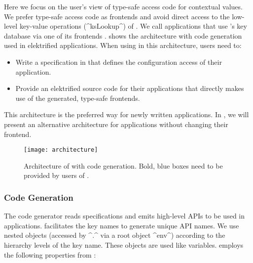 Here we focus on the user's view of type-safe access code for contextual values.
We prefer type-safe access code as frontends and avoid direct access to the low-level key-value operations (^ksLookup^) of .
We call applications that use \elektra{}'s key database via one of its frontends .
 shows the architecture with code generation used in elektrified applications.
When using  in this architecture, users need to:
\begin{itemize}
\item Write a specification in  that defines the configuration access of their application.
\item Provide an elektrified source code for their applications that directly makes use of the generated, type-safe frontends.
\end{itemize}
This architecture is the preferred way for newly written applications.
In , we will present an alternative architecture for applications without changing their frontend.


\begin{figure}[htp]
\centering
\texttt{[image: architecture]}
\caption[Architecture of \elektra{}.]{Architecture of \elektra{} with code generation.
Bold, blue boxes need to be provided by users of \elektra{}.}
\label{fig:architecture}
\end{figure}

\subsubsection{Code Generation}
\label{sec:approach-code-generation}

The code generator  reads  specifications and emits high-level APIs to be used in applications.
 facilitates the key names to generate unique API names.
We use nested objects (accessed by ^.^ via a root object ^env^) according to the hierarchy levels of the key name.
These objects are used like variables.
 employs the following properties from :

